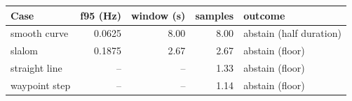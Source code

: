 \footnotesize
\begin{tabular}{lrrrl}
\toprule
Case & f95 (Hz) & window (s) & samples & outcome \\
\midrule
smooth curve & 0.0625 & 8.00 & 8.00 & abstain (half duration) \\
slalom & 0.1875 & 2.67 & 2.67 & abstain (floor) \\
straight line & -- & -- & 1.33 & abstain (floor) \\
waypoint step & -- & -- & 1.14 & abstain (floor) \\
\bottomrule
\end{tabular}
